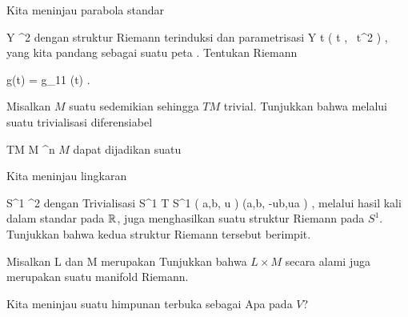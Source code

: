 \setcounter{section}{16}


{}
{

Kita meninjau parabola standar

\mavergleichskette
{\vergleichskette
{ Y
}
{ \subseteq }{ \R^2
}
{  }{
}
{    }{
}
{   }{
}
}
{}{}{}
dengan struktur Riemann terinduksi dan parametrisasi
\maabbeledisp {\varphi} {\R} { Y
} { t } { \left(  t   , \,  t^2                   \right)
} {,}
yang kita pandang sebagai suatu peta
 {} {.}
Tentukan
Riemann

\mavergleichskette
{\vergleichskette
{ g(t)
}
{ = }{ g_{11} (t)
}
{  }{
}
{    }{
}
{   }{
}
}
{}{}{.}

}
{} {}

{}
{

Misalkan $M$ suatu
sedemikian sehingga
$TM$ trivial. Tunjukkan bahwa melalui suatu trivialisasi diferensiabel

\mavergleichskette
{\vergleichskette
{ TM
}
{ \cong }{ M \times \R^n
}
{  }{
}
{    }{
}
{   }{
}
}
{}{}{}
 {} {}
$M$ dapat dijadikan suatu

}
{} {}

{}
{

Kita meninjau lingkaran

\mavergleichskette
{\vergleichskette
{ S^1
}
{ \subseteq }{ \R^2
}
{  }{
}
{    }{
}
{   }{
}
}
{}{}{}
dengan
Trivialisasi
\maabbeledisp {} { S^1 \times \R } { T S^1
} {( a,b, u )} { (a,b, -ub,ua )
} {,}
melalui hasil kali dalam standar pada ${\mathbb R}$, juga menghasilkan suatu struktur Riemann pada $S^1$. Tunjukkan bahwa kedua struktur Riemann tersebut berimpit.

}
{} {}

{}
{

Misalkan
\mathkor {} {L} {dan} {M} {}
merupakan
Tunjukkan bahwa $L \times M$ secara alami juga merupakan suatu manifold Riemann.

}
{} {}

{}
{

Kita meninjau suatu himpunan terbuka
 sebagai
 Apa
 pada $V$?

}
{} {}

